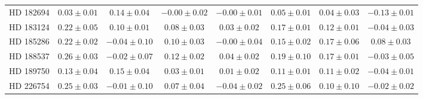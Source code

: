 \begin{table*}
\begin{tabular}{cccccccc}
HD 182694 & $0.03 \pm 0.01$ & $0.14 \pm 0.04$ & $-0.00 \pm 0.02$ & $-0.00 \pm 0.01$ & $0.05 \pm 0.01$ & $0.04 \pm 0.03$ & $-0.13 \pm 0.01$ \\
HD 183124 & $0.22 \pm 0.05$ & $0.10 \pm 0.01$ & $0.08 \pm 0.03$ & $0.03 \pm 0.02$ & $0.17 \pm 0.01$ & $0.12 \pm 0.01$ & $-0.04 \pm 0.03$ \\
HD 185286 & $0.22 \pm 0.02$ & $-0.04 \pm 0.10$ & $0.10 \pm 0.03$ & $-0.00 \pm 0.04$ & $0.15 \pm 0.02$ & $0.17 \pm 0.06$ & $0.08 \pm 0.03$ \\
HD 188537 & $0.26 \pm 0.03$ & $-0.02 \pm 0.07$ & $0.12 \pm 0.02$ & $0.04 \pm 0.02$ & $0.19 \pm 0.10$ & $0.17 \pm 0.01$ & $-0.03 \pm 0.05$ \\
HD 189750 & $0.13 \pm 0.04$ & $0.15 \pm 0.04$ & $0.03 \pm 0.01$ & $0.01 \pm 0.02$ & $0.11 \pm 0.01$ & $0.11 \pm 0.02$ & $-0.04 \pm 0.01$ \\
HD 226754 & $0.25 \pm 0.03$ & $-0.01 \pm 0.10$ & $0.07 \pm 0.04$ & $-0.04 \pm 0.02$ & $0.25 \pm 0.06$ & $0.10 \pm 0.10$ & $-0.02 \pm 0.02$ \\
\hline
\end{tabular}
\end{table*}
